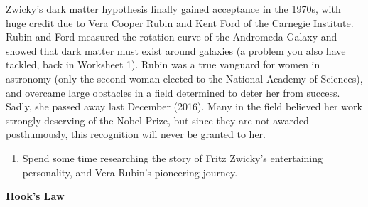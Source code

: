 \documentclass[11pt]{article}
\renewcommand{\section}[1]{\textbf{\underline{#1}}}
\begin{document}
Zwicky's dark matter hypothesis finally gained acceptance in the
1970s, with huge credit due to Vera Cooper Rubin and Kent Ford of the
Carnegie Institute. Rubin and Ford measured the rotation curve of the
Andromeda Galaxy and showed that dark matter must exist around
galaxies (a problem you also have tackled, back in Worksheet 1). Rubin
was a true vanguard for women in astronomy (only the second woman
elected to the National Academy of Sciences), and overcame large
obstacles in a field determined to deter her from success. Sadly, she
passed away last December (2016). Many in the field believed her
work strongly deserving of the Nobel Prize, but since they are not
awarded posthumously, this recognition will never be granted to her.

\begin{enumerate}[resume]
\item
  Spend some time researching the story of Fritz Zwicky's entertaining
  personality, and Vera Rubin's pioneering journey.
\end{enumerate}

\section{Hook's Law}
\end{document}

